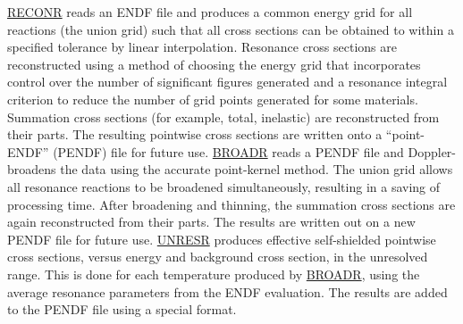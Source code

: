 \hyperlink{sRECONRhy}{RECONR}
reads an ENDF file
and produces a common energy grid for all reactions (the union grid)
 such that all cross sections can be obtained to
within a specified tolerance by linear interpolation.  Resonance
cross sections are reconstructed
using a method of choosing the energy grid that incorporates
control over the number of significant figures
generated and a resonance integral criterion to reduce the number
of grid points generated for some materials.  Summation cross sections
 (for example, total, inelastic) are
reconstructed from their parts.  The resulting pointwise cross sections
 are written onto a ``point-ENDF''
(PENDF) file for future use.  \hyperlink{sBROADRhy}{BROADR}
 reads a
PENDF file and Doppler-broadens
the data using the accurate point-kernel method.
The union grid allows all resonance reactions to be broadened
simultaneously, resulting in a saving of processing time.  After
broadening and thinning, the summation cross sections are again
reconstructed from their parts.  The results are written out on a
new PENDF file for future use.  \hyperlink{sUNRESRhy}{UNRESR}
 produces effective
self-shielded pointwise cross sections,
versus energy and background cross section, in the unresolved
 range.  This is done
for each temperature produced by \hyperlink{sBROADRhy}{BROADR},
using the average resonance parameters from the ENDF
evaluation.  The results are added to the PENDF file using a
special format.

